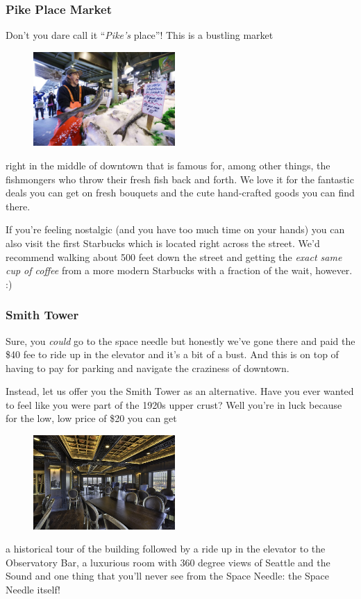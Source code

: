 \documentclass[12pt]{article}
\begin{document}
\subsubsection{Pike Place Market}
Don't you dare call it ``\textit{Pike's} place''! This is a bustling market 
\begin{figure}
    \centering
    \includegraphics[width=0.48\textwidth]{fish.jpg}
\end{figure}
right in the middle
of downtown that is famous for, among other things, the fishmongers who throw their fresh
fish back and forth. We love it for the fantastic deals you can get on fresh bouquets and the
cute hand-crafted goods you can find there.

If you're feeling nostalgic (and you have too much time on your hands) you can also visit the first Starbucks
which is located right across the street. We'd recommend walking about 500 feet down the street
and getting the \textit{exact same cup of coffee} from a more modern Starbucks with a fraction of the wait, however. :)

\subsubsection{Smith Tower}
Sure, you \textit{could} go to the space needle but honestly we've gone there and paid the \$40 fee to ride up in
the elevator and it's a bit of a bust. And this is on top of having to pay for parking and navigate the craziness
of downtown.

Instead, let us offer you the Smith Tower as an alternative. Have you ever wanted to feel like you 
were part of the 1920s upper crust? Well you're in luck because for the low, low price of \$20 you 
can get 
\begin{figure}
    \centering
    \includegraphics[width=0.48\textwidth]{smith.jpg}
\end{figure}
a historical tour of the building followed by a ride up in the elevator to the Observatory Bar,
a luxurious room with 360 degree views of Seattle and the Sound and one thing that you'll 
never see from the Space Needle: the Space Needle itself!
\end{document}

